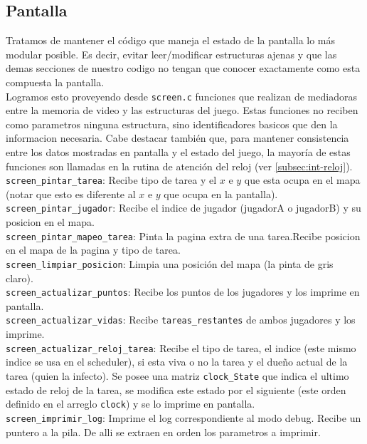 \subsection{Pantalla}

Tratamos de mantener el código que maneja el estado de la pantalla lo más modular posible. Es decir, evitar leer/modificar estructuras ajenas  y que las demas secciones de nuestro codigo no tengan que conocer exactamente como esta compuesta la pantalla.\\

Logramos esto proveyendo desde  \verb|screen.c| funciones que realizan de mediadoras entre la memoria de video y las estructuras del juego. Estas funciones no reciben como parametros ninguna estructura, sino identificadores basicos que den la informacion necesaria. Cabe destacar también que, para mantener consistencia entre los datos mostradas en pantalla y el estado del juego, la mayoría de estas funciones son llamadas en la rutina de atención del reloj (ver \ref{subsec:int-reloj}).\\


\verb|screen_pintar_tarea|: Recibe tipo de tarea y el $x$ e $y$ que esta ocupa en el mapa (notar que esto es diferente al $x$ e $y$ que ocupa en la pantalla).\\

\verb|screen_pintar_jugador|: Recibe el indice de jugador (jugadorA o jugadorB) y su posicion en el mapa.\\

\verb|screen_pintar_mapeo_tarea|: Pinta la pagina extra de una tarea.Recibe posicion en el mapa de la pagina y tipo de tarea.\\

\verb|screen_limpiar_posicion|: Limpia una posición del mapa (la pinta de gris claro).\\

\verb|screen_actualizar_puntos|: Recibe los puntos de los jugadores y los imprime en pantalla.\\

\verb|screen_actualizar_vidas|: Recibe \verb|tareas_restantes| de ambos jugadores y los imprime.\\

\verb|screen_actualizar_reloj_tarea|: Recibe el tipo de tarea, el indice (este mismo indice se usa en el scheduler), si esta viva o no la tarea y el dueño actual de la tarea (quien la infecto). Se posee una matriz \verb|clock_State| que indica el ultimo estado de reloj de la tarea, se modifica este estado por el siguiente (este orden definido en el arreglo \verb|clock|) y se lo imprime en pantalla.\\

\verb|screen_imprimir_log|: Imprime el log correspondiente al modo debug. Recibe un puntero a la pila. De alli se extraen en orden los parametros a imprimir.\\

